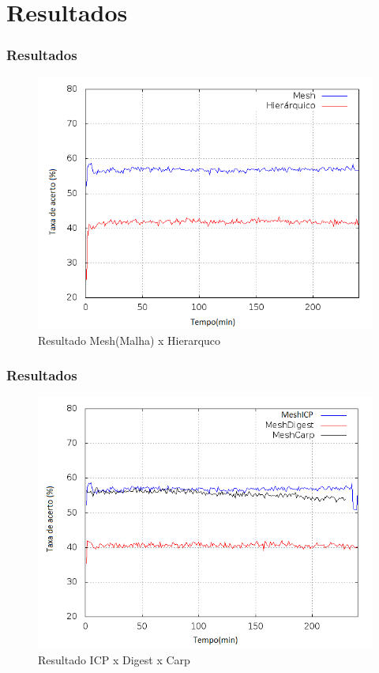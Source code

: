 \documentclass{beamer}
\begin{document}
    \section{Resultados}
    \begin{frame}
     \frametitle{Resultados}     
    \begin{figure}
      \centering
      \includegraphics[scale=0.4]{imagens/meshhierarquico.png}
      \caption{Resultado Mesh(Malha) x Hierarquco}
    \end{figure}
    \end{frame}

    \begin{frame}
     \frametitle{Resultados}     
     \begin{figure}
      \centering
      \includegraphics[scale=0.4]{imagens/protocolos.png}
      \caption{Resultado ICP x Digest x Carp}
      \end{figure}
    \end{frame}
\end{document}
